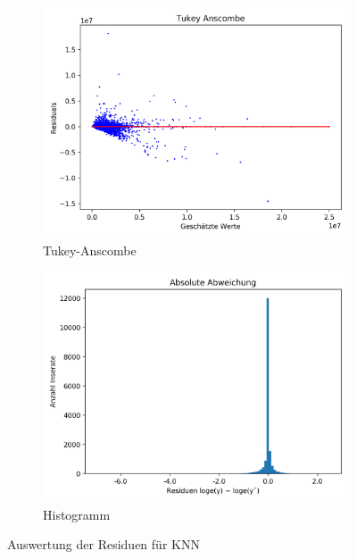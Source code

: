 \begin{figure}[h]
\begin{subfigure}{.5\textwidth}
  \centering
  \includegraphics[width=\linewidth]{images/KNeighbour_tukey.png}
  \caption[Tukey-Anscombe]{Tukey-Anscombe}
  \label{fig:kneighbour_tukey-anscombe}
\end{subfigure}
\begin{subfigure}{.5\textwidth}
  \centering
  \includegraphics[width=\linewidth]{images/KNeighbour_residuen.png}
  \caption[Histogramm]{Histogramm}
  \label{fig:kneighbour_histo}
\end{subfigure}
\caption[Auswertung der Residuen für KNN]{Auswertung der Residuen für KNN}
\label{fig:kneighbour}
\end{figure}

